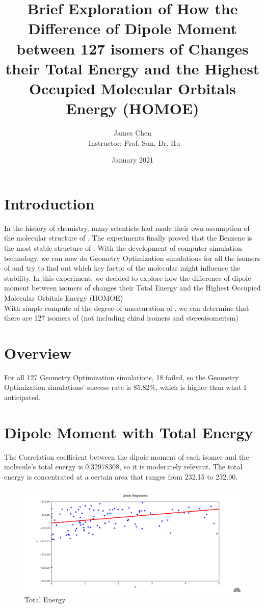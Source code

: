 \documentclass{article}
\title{Brief Exploration of How the Difference of Dipole Moment between 127 isomers of \ce{C6H6} Changes their Total Energy and the Highest Occupied Molecular Orbitals Energy (HOMOE) }
\author{James Chen \\ \ Instructor: Prof. Sun, Dr. Hu}
\date{January 2021}
\begin{document}
\maketitle

\section{Introduction}
In the history of chemistry, many scientists had made their own assumption of the molecular structure of . The experiments finally proved that the Benzene is the most stable structure of . With the development of computer simulation technology, we can now do Geometry Optimization simulations for all the isomers of  and try to find out which key factor of the molecular might influence the stability. In this experiment, we decided to explore how the difference of dipole moment between isomers of  changes their Total Energy and the Highest Occupied Molecular Orbitals Energy (HOMOE) \\ With simple compute of the degree of unsaturation of , we can determine that there are 127 isomers of  (not including chiral isomers and stereoisomerism)



\section{Overview}
For all 127 Geometry Optimization simulations, 18 failed, so the Geometry Optimization simulations' success rate is 85.82\%, which is higher than what I anticipated. 


\section{Dipole Moment with Total Energy}
The Correlation coefficient between the dipole moment of each isomer and the molecule's total energy is 0.32978308, so it is moderately relevant. The total energy is concentrated at a certain area that ranges from 232.15 to 232.00.
\begin{figure}[H]
\centering
\includegraphics[scale=0.35]{total energy fit.png}
\caption{Total Energy}
\label{fig:universe}
\end{figure}
\end{document}
